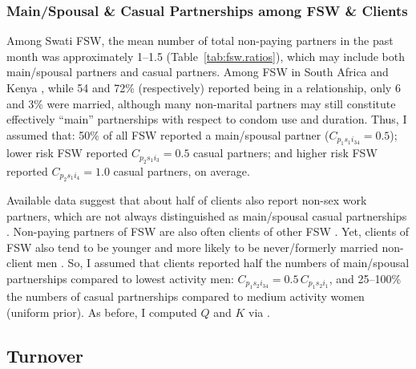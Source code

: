 \subsubsection{Main/Spousal \& Casual Partnerships among FSW \& Clients}\label{model.par.nsw.sw}
Among Swati FSW, the mean number of total non-paying partners in the past month was
approximately 1--1.5 (Table~\ref{tab:fsw.ratios}),
which may include both main/spousal partners and casual partners.
Among FSW in South Africa \cite{Wells2018} and Kenya \cite{Voeten2007},
while 54 and 72\% (respectively) reported being in a relationship, only 6 and 3\% were married,
although many non-marital partners may still constitute effectively ``main'' partnerships
with respect to condom use and duration.
Thus, I assumed that:
50\% of all FSW reported a main/spousal partner (\ie $C_{p_{1}s_{1}i_{34}} = 0.5$);
lower risk FSW reported $C_{p_{2}s_{1}i_{3}} = 0.5$ casual partners; and
higher risk FSW reported $C_{p_{2}s_{1}i_{4}} = 1.0$ casual partners, on average.
\par
Available data suggest that about half of clients also report non-sex work partners,
which are not always distinguished as main/spousal \vs casual partnerships
\cite{Lowndes2000,Santo2005}.
Non-paying partners of FSW are also often clients of other FSW \cite{Voeten2007,Godin2008}.
Yet, clients of FSW also tend to be younger and more likely to be
never/formerly married \vs non-client men \cite{Lowndes2000,Carael2006}.
So, I assumed that clients reported
half the numbers of main/spousal partnerships compared to lowest activity men:
$C_{p_{1}s_{2}i_{34}} = 0.5\,C_{p_{1}s_{2}i_{1}}$, and
25--100\% the numbers of casual partnerships compared to medium activity women (uniform prior).
As before, I computed $Q$ and $K$ via .
\subsection{Turnover}\label{model.par.turnover}
